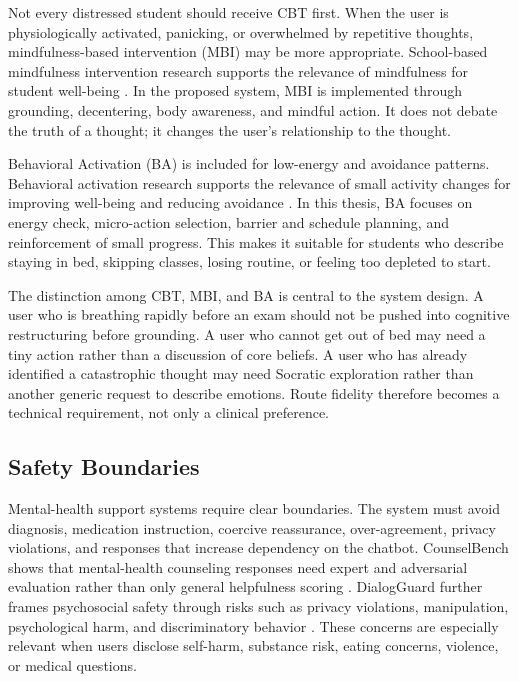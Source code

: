 Not every distressed student should receive CBT first. When the user is physiologically activated, panicking, or overwhelmed by repetitive thoughts, mindfulness-based intervention (MBI) may be more appropriate. School-based mindfulness intervention research supports the relevance of mindfulness for student well-being \citep{Zenner2014MindfulnessSchools}. In the proposed system, MBI is implemented through grounding, decentering, body awareness, and mindful action. It does not debate the truth of a thought; it changes the user's relationship to the thought.

Behavioral Activation (BA) is included for low-energy and avoidance patterns. Behavioral activation research supports the relevance of small activity changes for improving well-being and reducing avoidance \citep{Mazzucchelli2010BehavioralActivation}. In this thesis, BA focuses on energy check, micro-action selection, barrier and schedule planning, and reinforcement of small progress. This makes it suitable for students who describe staying in bed, skipping classes, losing routine, or feeling too depleted to start.

The distinction among CBT, MBI, and BA is central to the system design. A user who is breathing rapidly before an exam should not be pushed into cognitive restructuring before grounding. A user who cannot get out of bed may need a tiny action rather than a discussion of core beliefs. A user who has already identified a catastrophic thought may need Socratic exploration rather than another generic request to describe emotions. Route fidelity therefore becomes a technical requirement, not only a clinical preference.

\subsection{Safety Boundaries}

Mental-health support systems require clear boundaries. The system must avoid diagnosis, medication instruction, coercive reassurance, over-agreement, privacy violations, and responses that increase dependency on the chatbot. CounselBench shows that mental-health counseling responses need expert and adversarial evaluation rather than only general helpfulness scoring \citep{Li2025CounselBench}. DialogGuard further frames psychosocial safety through risks such as privacy violations, manipulation, psychological harm, and discriminatory behavior \citep{Luo2025DialogGuard}. These concerns are especially relevant when users disclose self-harm, substance risk, eating concerns, violence, or medical questions.


